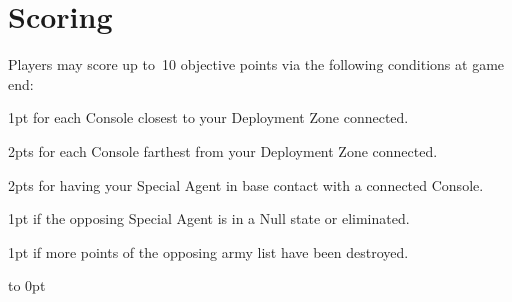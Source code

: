 \section{Scoring}

Players may score up to~10 objective points via the following
conditions at game end:
\begin{squishitemize}
\item 1pt for each Console closest to your Deployment Zone connected.
\item 2pts for each Console farthest from your Deployment Zone
  connected.
\item 2pts for having your Special Agent in base contact with a
  connected Console.
\item 1pt if the opposing Special Agent is in a Null state or eliminated.
\item 1pt if more points of the opposing army list have been destroyed.
\end{squishitemize}

\vfill
\vbox to 0pt{}